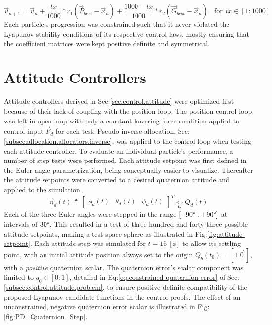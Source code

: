 \begin{equation}
\vec{v}_{n+1}=\vec{v}_n+\frac{tx}{1000}\ast r_1(\vec{P}_{best}-\vec{x}_n)+\frac{1000-tx}{1000}\ast r_2(\vec{G}_{best}-\vec{x}_n)~~~~\text{for}~~tx\in[1:1000]
\end{equation}
Each particle's progression was constrained such that it never violated the Lyapunov stability conditions of its respective control laws, mostly ensuring that the coefficient matrices were kept positive definite and symmetrical.
\section{Attitude Controllers}
\label{sec:simulation.attitude}
Attitude controllers derived in Sec:\ref{sec:control.attitude} were optimized first because of their lack of coupling with the position loop. The position control loop was left in open loop with only a constant hovering force condition applied to control input $\vec{F}_d$ for each test. Pseudo inverse allocation, Sec:\ref{subsec:allocation.allocators.inverse}, was applied to the control loop when testing each attitude controller. To evaluate an individual particle's performance, a number of step tests were performed. Each attitude setpoint was first defined in the Euler angle parametrization, being conceptually easier to visualize. Thereafter the attitude setpoints were converted to a desired quaternion attitude and applied to the simulation.
\begin{equation}
\vec{\eta}_d(t)\triangleq \begin{bmatrix}
\phi_d(t)&
\theta_d(t)&
\psi_d(t)
\end{bmatrix}^T\underset{Q}{\iff}Q_d(t)
\end{equation}
Each of the three Euler angles were stepped in the range $[-90\text{\textdegree}:+90\text{\textdegree}]$ at intervals of $30\text{\textdegree}$. This resulted in a test of three hundred and forty three possible attitude setpoints, making a test-space sphere as illustrated in Fig:\ref{fig:attitude-setpoint}. Each attitude step was simulated for $t=15~[\text{s}]$ to allow its settling point, with an initial attitude position always set to the origin $Q_b(t_0)=[1~\vec{0}\hspace{2pt}]$, with a \emph{positive} quaternion scalar. The quaternion error's scalar component was limited to $q_0\in[0:1]$, detailed in Eq:\ref{eq:constrained-quaternion-error} of Sec:\ref{subsec:control.attitude.problem}, to ensure positive definite compatibility of the proposed Lyapunov candidate functions in the control proofs. The effect of an unconstrained, negative quaternion error scalar is illustrated in Fig:\ref{fig:PD_Quaternion_Step}. 
